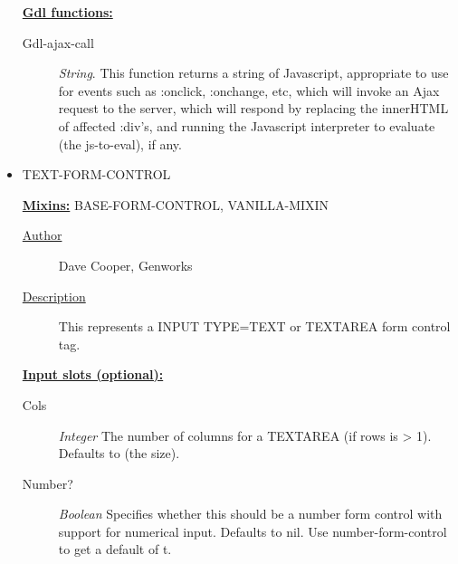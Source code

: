 \documentclass [11pt]{book}
\begin{document}
\begin{itemize}
\begin{description}
\end{description}






\textbf{
\underline{Gdl functions:}}

\begin{description}

\item [Gdl-ajax-call]
\emph{String}.
This function returns a string of Javascript, appropriate to use for events
such as :onclick, :onchange, etc, which will invoke an Ajax request to the
server, which will respond by replacing the innerHTML of affected :div's, and
running the Javascript interpreter to evaluate (the js-to-eval), if any.


\end{description}







\item {}TEXT-FORM-CONTROL


\textbf{
\underline{Mixins:}} BASE-FORM-CONTROL, VANILLA-MIXIN





\begin{description}

\item [
\underline{Author}]


Dave Cooper, Genworks



\item [
\underline{Description}]


This represents a INPUT TYPE=TEXT or TEXTAREA form control tag.



\end{description}








\textbf{
\underline{Input slots (optional):}}

\begin{description}

\item [Cols]
\emph{Integer} The number of columns for a TEXTAREA (if rows is > 1). Defaults to (the size).


\item [Number?]
\emph{Boolean} Specifies whether this should be a number form control with support for numerical input.
Defaults to nil. Use number-form-control to get a default of t.



\end{description}
\end{itemize}
\end{document}
